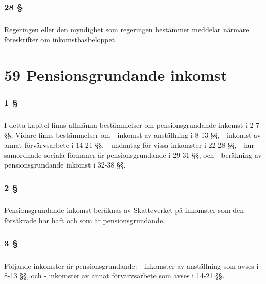 \documentclass[a4paper,notitlepage,openany,10pt]{book}
\begin{document}
\subsection*{28 §}
\paragraph*{}
Regeringen eller den myndighet som regeringen bestämmer meddelar närmare föreskrifter om inkomstbasbeloppet.
\chapter*{59 Pensionsgrundande inkomst}
\subsection*{1 §}
\paragraph*{}
I detta kapitel finns allmänna bestämmelser om pensionsgrundande inkomst i 2-7 §§,
Vidare finns bestämmelser om
\newline - inkomst av anställning i 8-13 §§,
\newline - inkomst av annat förvärvsarbete i 14-21 §§,
\newline - undantag för vissa inkomster i 22-28 §§,
\newline - hur samordnade sociala förmåner är pensionsgrundande i 29-31 §§, och
\newline - beräkning av pensionsgrundande inkomst i 32-38 §§.
\subsection*{2 §}
\paragraph*{}
Pensionsgrundande inkomst beräknas av Skatteverket på inkomster som den försäkrade har haft och som är pensionsgrundande.
\subsection*{3 §}
\paragraph*{}
Följande inkomster är pensionsgrundande:
\newline - inkomster av anställning som avses i 8-13 §§, och
\newline - inkomster av annat förvärvsarbete som avses i 14-21 §§.
\end{document}
